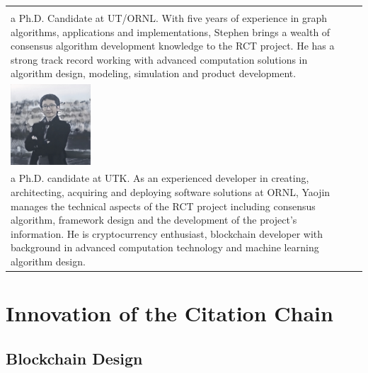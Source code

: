 \documentclass[a4paper,oneside,openany]{tufte-book}
\begin{document}
\begin{table}[ht]
\begin{tabular}{ l | l }
\begin{minipage}{40em}
  \emph{Stephen Grady} \\ a Ph.D. Candidate at UT/ORNL. With five years of experience in graph algorithms, applications and implementations, Stephen brings a wealth of consensus algorithm development knowledge to the RCT project. He has a strong track record working with advanced computation solutions in algorithm design, modeling, simulation and product development.
\end{minipage} \\
     \includegraphics[width=30mm]{fig/p1} & \begin{minipage}{40em}
  \emph{Yaojin Sun} \\ a Ph.D. candidate at UTK. As an experienced developer in creating, architecting, acquiring and deploying software solutions at ORNL, Yaojin manages the technical aspects of the RCT project including consensus algorithm, framework design and the development of the project’s information. He is cryptocurrency enthusiast, blockchain developer with background in advanced computation technology and machine learning algorithm design.
\end{minipage}
\end{tabular}
\end{table}



























\chapter{Innovation of the Citation Chain}



\section{Blockchain Design}
\end{document}
